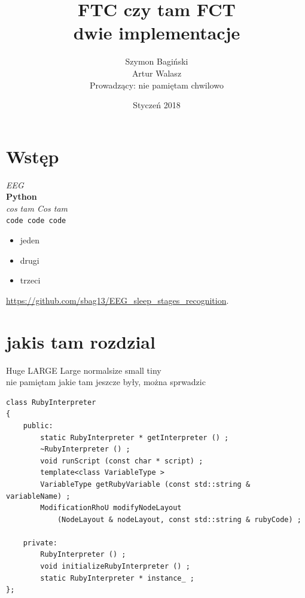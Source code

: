 \documentclass[12pt, notitlepage]{report}
\begin{document}
\begin{titlepage}
    \thispagestyle{empty}
    \title{\textbf{\Huge FTC czy tam FCT \\[1cm]\LARGE dwie implementacje}}
    \author{Szymon Bagiński \\ Artur Walasz \\[1cm]{\small Prowadzący: nie pamiętam chwilowo}}
    \date{Styczeń 2018}
    \maketitle
    \vfill
    \renewcommand{\chapter}[2]{}
    \begin{center}
        \Large \bfseries\contentsname
    \end{center}
    \tableofcontents
    \vfill
\end{titlepage}    

\chapter*{Wstęp}
    \textit{EEG} \\
    \textbf{Python} \\
    \textsl{cos tam Cos tam} \\
    \texttt{code code code} \\

    \begin{itemize}
        \item jeden
        \item drugi
        \item trzeci
    \end{itemize}    
    
    \url{https://github.com/sbag13/EEG_sleep_stages_recognition}.

\chapter{jakis tam rozdzial}
\Huge Huge
\LARGE LARGE
\Large Large
\normalsize normalsize
\small small
\tiny tiny
\\
\normalsize nie pamiętam jakie tam jeszcze były, można sprwadzic

\begin{lstlisting}[caption=Interfejs klasy RubyInterpreter, label=rubyInterfejs]
class RubyInterpreter
{
    public:		
        static RubyInterpreter * getInterpreter () ;
        ~RubyInterpreter () ;
        void runScript (const char * script) ;
        template<class VariableType >
        VariableType getRubyVariable (const std::string & variableName) ;
        ModificationRhoU modifyNodeLayout 
            (NodeLayout & nodeLayout, const std::string & rubyCode) ;

    private:
        RubyInterpreter () ;
        void initializeRubyInterpreter () ;
        static RubyInterpreter * instance_ ;
};
\end{lstlisting}
\end{document}
